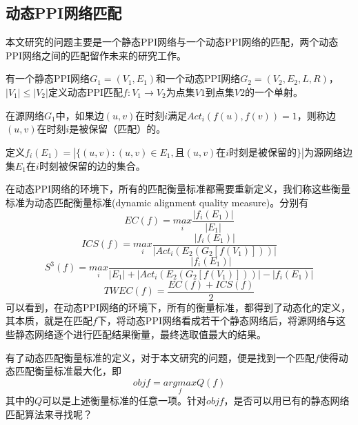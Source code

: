 \subsection{动态PPI网络匹配}
本文研究的问题主要是一个静态PPI网络与一个动态PPI网络的匹配，两个动态PPI网络之间的匹配留作未来的研究工作。

有一个静态PPI网络$G_1=(V_1,E_1)$和一个动态PPI网络$G_2=(V_2,E_2,L,R)$，$|V_1|\leq |V_2|$定义动态PPI匹配$f:V_1\rightarrow V_2$为点集$V1$到点集$V2$的一个单射。

在源网络$G_1$中，如果边$(u,v)$在时刻$i$满足$Act_i(f(u),f(v))=1$，则称边$(u,v)$在时刻$i$是被保留（匹配）的。

定义$f_i(E_1)=|\{(u,v):(u,v)\in E_1, \text{且} (u,v)\text{在$i$时刻是被保留的}\}|$为源网络边集$E_1$在$i$时刻被保留的边的集合。

在动态PPI网络的环境下，所有的匹配衡量标准都需要重新定义，我们称这些衡量标准为动态匹配衡量标准(dynamic alignment quality measure)。分别有
\begin{equation}\label{myworkecdefine}
    EC(f)=\underset{i}{max}\frac{\left | f_i(E_1) \right |}{\left | E_1 \right |}
\end{equation}
\begin{equation}\label{myworkicsdefine}
    ICS(f)=\underset{i}{max}\frac{\left | f_i(E_1) \right |}{\left |Act_i(E_2(G_2[f(V_1)]))\right |}
\end{equation}
\begin{equation}\label{myworks3define}
S^{3}(f)=\underset{i}{max}\frac{\left | f_i(E_1) \right |}{\left | E_1 \right |+\left |Act_i(E_2(G_2[f(V_1)])) \right |-\left | f_i(E_1) \right |}
\end{equation}
\begin{equation}\label{myworktwecdefine}
    TWEC(f)=\frac{EC(f)+ICS(f)}{2}
\end{equation}
可以看到，在动态PPI网络的环境下，所有的衡量标准，都得到了动态化的定义，其本质，就是在匹配$f$下，将动态PPI网络看成若干个静态网络后，将源网络与这些静态网络逐个进行匹配结果衡量，最终选取值最大的结果。

有了动态匹配衡量标准的定义，对于本文研究的问题，便是找到一个匹配$f$使得动态匹配衡量标准最大化，即
\begin{equation}\label{myworktwobjdefine}
    objf=\underset{f}{argmax}Q(f)
\end{equation}
其中的$Q$可以是上述衡量标准的任意一项。针对$objf$，是否可以用已有的静态网络匹配算法来寻找呢？

